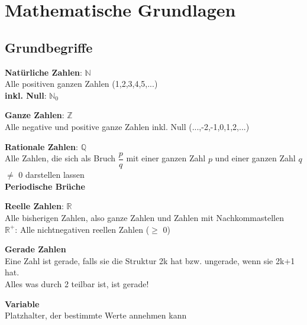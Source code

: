 \section{Mathematische Grundlagen}

\subsection{Grundbegriffe}

\begin{definitionbox}
\textbf{Natürliche Zahlen}: $\mathbb{N}$\\
Alle positiven ganzen Zahlen (1,2,3,4,5,...)\\
\textbf{inkl. Null}: $\mathbb{N}_0$
\end{definitionbox}

\begin{definitionbox}
\textbf{Ganze Zahlen}: $\mathbb{Z}$\\
Alle negative und positive ganze Zahlen inkl. Null (...,-2,-1,0,1,2,...)
\end{definitionbox}

\begin{definitionbox}
\textbf{Rationale Zahlen}: $\mathbb{Q}$\\
Alle Zahlen, die sich als Bruch $\dfrac{p}{q}$ mit einer ganzen Zahl $p$ und einer ganzen Zahl $q$ $\neq$ $0$ darstellen lassen\\
\textbf{Periodische Brüche}
\end{definitionbox}

\begin{definitionbox}
\textbf{Reelle Zahlen}: $\mathbb{R}$\\
Alle bisherigen Zahlen, also ganze Zahlen und Zahlen mit Nachkommastellen\\
\textbf{$\mathbb{R}^+$}: Alle nichtnegativen reellen Zahlen ($\geq$ 0)
\end{definitionbox}

\begin{definitionbox}
\textbf{Gerade Zahlen}\\
Eine Zahl ist gerade, falls sie die Struktur 2k hat bzw. ungerade, wenn sie 2k+1 hat.\\
Alles was durch 2 teilbar ist, ist gerade!
\end{definitionbox}

\begin{definitionbox}
\textbf{Variable}\\
Platzhalter, der bestimmte Werte annehmen kann
\end{definitionbox}

